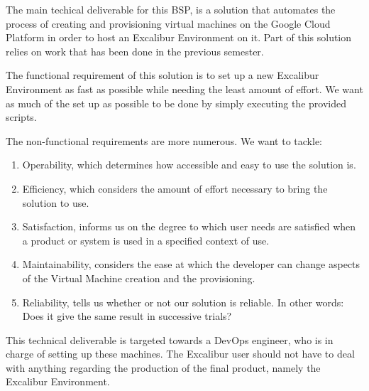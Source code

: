 The main techical deliverable for this BSP, is a solution that
automates the process of creating and provisioning virtual machines on
the Google Cloud Platform in order to host an Excalibur Environment on
it. Part of this solution relies on work that has been done in the
previous semester. 

The functional requirement of this solution is to set up a new
Excalibur Environment as fast as possible while needing the least
amount of effort. We want as much of the set up as possible to be done
by simply executing the provided scripts.

The non-functional requirements are more numerous. We want to tackle:
\begin{enumerate}
	\item Operability, which determines how accessible and easy to use
		the solution is.
	\item Efficiency, which considers the amount of effort necessary
		to bring the solution to use.
	\item Satisfaction, informs us on the degree to which user needs
		are satisfied when a product or system is used in a specified
		context of use.
	\item Maintainability, considers the ease at which the developer
		can change aspects of the Virtual Machine creation and the
		provisioning.
	\item Reliability, tells us whether or not our solution is
		reliable. In other words: Does it give the same result in
		successive trials?
\end{enumerate}

This technical deliverable is targeted towards a DevOps engineer, who
is in charge of setting up these machines. The Excalibur user should
not have to deal with anything regarding the production of the final
product, namely the Excalibur Environment.
